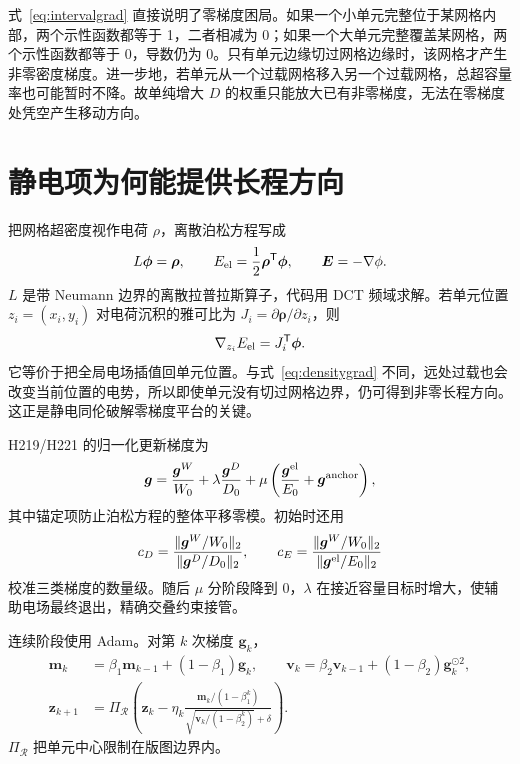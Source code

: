 \documentclass[UTF8,a4paper,11pt]{ctexrep}
\begin{document}
式~\eqref{eq:intervalgrad} 直接说明了零梯度困局。如果一个小单元完整位于某网格内部，两个示性函数都等于 1，二者相减为 0；如果一个大单元完整覆盖某网格，两个示性函数都等于 0，导数仍为 0。只有单元边缘切过网格边缘时，该网格才产生非零密度梯度。进一步地，若单元从一个过载网格移入另一个过载网格，总超容量率也可能暂时不降。故单纯增大 $D$ 的权重只能放大已有非零梯度，无法在零梯度处凭空产生移动方向。

\section{静电项为何能提供长程方向}
把网格超密度视作电荷 $\rho$，离散泊松方程写成
\begin{equation}
 L\bm\phi=\bm\rho,\qquad
 E_{\rm el}=\frac12\bm\rho^{\mathsf T}\bm\phi,
 \qquad \bm E=-\nabla\phi. \label{eq:poisson}
\end{equation}
$L$ 是带 Neumann 边界的离散拉普拉斯算子，代码用 DCT 频域求解。若单元位置 $z_i=(x_i,y_i)$ 对电荷沉积的雅可比为 $J_i=\partial\bm\rho/\partial z_i$，则
\begin{equation}
 \nabla_{z_i}E_{\rm el}=J_i^{\mathsf T}\bm\phi. \label{eq:electrograd}
\end{equation}
它等价于把全局电场插值回单元位置。与式~\eqref{eq:densitygrad} 不同，远处过载也会改变当前位置的电势，所以即使单元没有切过网格边界，仍可得到非零长程方向。这正是静电同伦破解零梯度平台的关键。

H219/H221 的归一化更新梯度为
\begin{equation}
 \bm g=\frac{\bm g^W}{W_0}
 +\lambda\frac{\bm g^D}{D_0}
 +\mu\left(\frac{\bm g^{\rm el}}{E_0}+\bm g^{\rm anchor}\right), \label{eq:totalgrad}
\end{equation}
其中锚定项防止泊松方程的整体平移零模。初始时还用
\begin{equation}
 c_D=\frac{\|\bm g^W/W_0\|_2}{\|\bm g^D/D_0\|_2},\qquad
 c_E=\frac{\|\bm g^W/W_0\|_2}{\|\bm g^{\rm el}/E_0\|_2} \label{eq:gradbalance}
\end{equation}
校准三类梯度的数量级。随后 $\mu$ 分阶段降到 0，$\lambda$ 在接近容量目标时增大，使辅助电场最终退出，精确交叠约束接管。

连续阶段使用 Adam。对第 $k$ 次梯度 $\bm g_k$，
\begin{align}
 \bm m_k&=\beta_1\bm m_{k-1}+(1-\beta_1)\bm g_k,\qquad
 \bm v_k=\beta_2\bm v_{k-1}+(1-\beta_2)\bm g_k^{\odot2},\\
 \bm z_{k+1}&=\Pi_{\mathcal R}\left(\bm z_k-
 \eta_k\frac{\bm m_k/(1-\beta_1^k)}
 {\sqrt{\bm v_k/(1-\beta_2^k)}+\delta}\right). \label{eq:adam}
\end{align}
$\Pi_{\mathcal R}$ 把单元中心限制在版图边界内。
\end{document}
